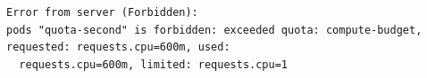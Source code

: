 \begin{Verbatim}[fontsize=\scriptsize]
Error from server (Forbidden):
pods "quota-second" is forbidden: exceeded quota: compute-budget, requested: requests.cpu=600m, used:
  requests.cpu=600m, limited: requests.cpu=1
\end{Verbatim}
